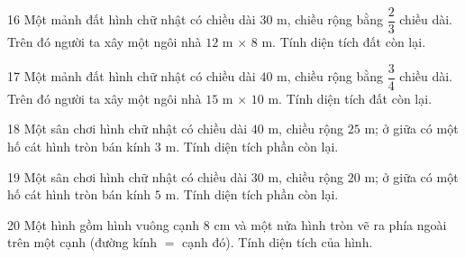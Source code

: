\gap
\begin{probbox}{16}{\relax}
Một mảnh đất hình chữ nhật có chiều dài $30$ m, chiều rộng bằng $\dfrac{2}{3}$ chiều dài. Trên đó người ta xây một ngôi nhà $12$ m $\times$ $8$ m. Tính diện tích đất còn lại.
\end{probbox}
\gap
\begin{probbox}{17}{\relax}
Một mảnh đất hình chữ nhật có chiều dài $40$ m, chiều rộng bằng $\dfrac{3}{4}$ chiều dài. Trên đó người ta xây một ngôi nhà $15$ m $\times$ $10$ m. Tính diện tích đất còn lại.
\end{probbox}
\gap
\begin{probbox}{18}{\relax}
Một sân chơi hình chữ nhật có chiều dài $40$ m, chiều rộng $25$ m; ở giữa có một hố cát hình tròn bán kính $3$ m. Tính diện tích phần còn lại.
\end{probbox}
\gap
\begin{probbox}{19}{\relax}
Một sân chơi hình chữ nhật có chiều dài $30$ m, chiều rộng $20$ m; ở giữa có một hố cát hình tròn bán kính $5$ m. Tính diện tích phần còn lại.
\end{probbox}
\gap
\begin{probbox}{20}{\relax}
Một hình gồm hình vuông cạnh $8$ cm và một nửa hình tròn vẽ ra phía ngoài trên một cạnh (đường kính $=$ cạnh đó). Tính diện tích của hình.
\end{probbox}
